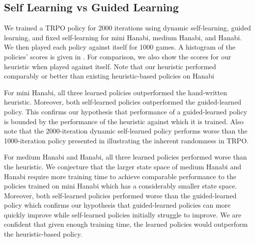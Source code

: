 \subsection{Self Learning vs Guided Learning}
We trained a TRPO policy for 2000 iterations using dynamic self-learning,
guided learning, and fixed self-learning for mini Hanabi, medium Hanabi, and
Hanabi. We then played each policy against itself for 1000 games. A histogram
of the policies' scores is given in . For comparison, we also show
the scores for our heuristic when played against itself. Note that our
heuristic performed comparably or better than existing heuristic-based policies
on Hanabi~\cite{osawa2015solving,walton2017evaluating}

For mini Hanabi, all three learned policies outperformed the hand-written
heuristic. Moreover, both self-learned policies outperformed the guided-learned
policy. This confirms our hypothesis that performance of a guided-learned
policy is bounded by the performance of the heuristic against which it is
trained. Also note that the 2000-iteration dynamic self-learned policy performs
worse than the 1000-iteration policy presented in  illustrating
the inherent randomness in TRPO.

For medium Hanabi and Hanabi, all three learned policies performed worse than
the heuristic. We conjecture that the larger state space of medium Hanabi and
Hanabi require more training time to achieve comparable performance to the
policies trained on mini Hanabi which has a considerably smaller state space.
Moreover, both self-learned policies performed worse than the guided-learned
policy which confirms our hypothesis that guided-learned policies can more
quickly improve while self-learned policies initially struggle to improve. We
are confident that given enough training time, the learned policies would
outperform the heuristic-based policy.


